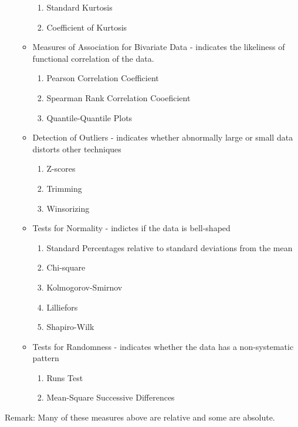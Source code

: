 \documentclass[10pt,]{book}
\theoremstyle{plain}
\theoremstyle{definition}
\theoremstyle{definition}
\numberwithin{equation}{section}
\begin{document}
\begin{itemize}[label=\textbullet]
\begin{itemize}[label=$\circ$]
\begin{enumerate}
\item\hypertarget{li-25}{}Standard Kurtosis%
\item\hypertarget{li-26}{}Coefficient of Kurtosis%
\end{enumerate}
%
\item{}Measures of Association for Bivariate Data 
			- indicates the likeliness of functional correlation of the data.
\begin{enumerate}
\item\hypertarget{li-28}{}Pearson Correlation Coefficient%
\item\hypertarget{li-29}{}Spearman Rank Correlation Cooeficient%
\item\hypertarget{li-30}{}Quantile-Quantile Plots%
\end{enumerate}
%
\item{}Detection of Outliers 
			- indicates whether abnormally large or small data distorts other 
			techniques
\begin{enumerate}
\item\hypertarget{li-32}{}Z-scores%
\item\hypertarget{li-33}{}Trimming%
\item\hypertarget{li-34}{}Winsorizing%
\end{enumerate}
%
\item{}Tests for Normality 
			- indictes if the data is bell-shaped
\begin{enumerate}
\item\hypertarget{li-36}{}Standard Percentages relative to standard deviations from the mean%
\item\hypertarget{li-37}{}Chi-square%
\item\hypertarget{li-38}{}Kolmogorov-Smirnov%
\item\hypertarget{li-39}{}Lilliefors%
\item\hypertarget{li-40}{}Shapiro-Wilk%
\end{enumerate}
%
\item{}Tests for Randomness 
			- indicates whether the data has a non-systematic pattern
\begin{enumerate}
\item\hypertarget{li-42}{}Runs Test%
\item\hypertarget{li-43}{}Mean-Square Successive Differences%
\end{enumerate}
%
\end{itemize}
%
\end{itemize}
Remark: Many of these measures above are relative and some are absolute.%
\typeout{************************************************}
\typeout{************************************************}
\end{document}
